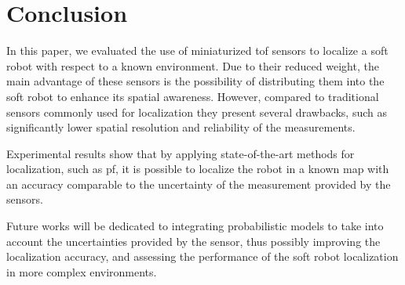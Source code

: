 
\section{Conclusion}\label{sec:conclusion}

In this paper, we evaluated the use of miniaturized \gls{tof} sensors to localize a soft robot with respect to a known environment.
Due to their reduced weight, the main advantage of these sensors is the possibility of distributing them into the soft robot to enhance its spatial awareness.
However, compared to traditional sensors commonly used for localization they present several drawbacks, such as significantly lower spatial resolution and reliability of the measurements.

Experimental results show that by applying state-of-the-art methods for localization, such as \gls{pf}, it is possible to localize the robot in a known map with an accuracy comparable to the uncertainty of the measurement provided by the sensors.

Future works will be dedicated to integrating probabilistic models to take into account the uncertainties provided by the sensor, thus possibly improving the localization accuracy, and 
assessing the performance of the soft robot localization in more complex environments.

